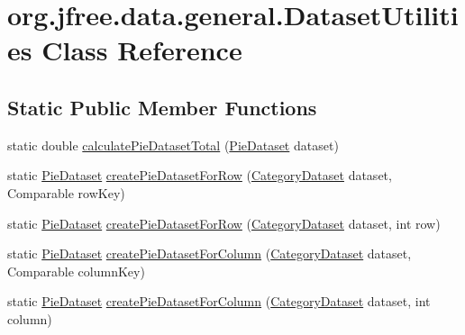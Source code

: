 \hypertarget{classorg_1_1jfree_1_1data_1_1general_1_1_dataset_utilities}{}\section{org.\+jfree.\+data.\+general.\+Dataset\+Utilities Class Reference}
\label{classorg_1_1jfree_1_1data_1_1general_1_1_dataset_utilities}
\subsection*{Static Public Member Functions}
\begin{DoxyCompactItemize}
\item 
static double \mbox{\hyperlink{classorg_1_1jfree_1_1data_1_1general_1_1_dataset_utilities_a576a9d596284f3e70b5db2d35bc0c935}{calculate\+Pie\+Dataset\+Total}} (\mbox{\hyperlink{interfaceorg_1_1jfree_1_1data_1_1general_1_1_pie_dataset}{Pie\+Dataset}} dataset)
\item 
static \mbox{\hyperlink{interfaceorg_1_1jfree_1_1data_1_1general_1_1_pie_dataset}{Pie\+Dataset}} \mbox{\hyperlink{classorg_1_1jfree_1_1data_1_1general_1_1_dataset_utilities_a13d630d93744c0af9a69fe7edafeb740}{create\+Pie\+Dataset\+For\+Row}} (\mbox{\hyperlink{interfaceorg_1_1jfree_1_1data_1_1category_1_1_category_dataset}{Category\+Dataset}} dataset, Comparable row\+Key)
\item 
static \mbox{\hyperlink{interfaceorg_1_1jfree_1_1data_1_1general_1_1_pie_dataset}{Pie\+Dataset}} \mbox{\hyperlink{classorg_1_1jfree_1_1data_1_1general_1_1_dataset_utilities_a87cf3dfa610dd380c0aad6e57db00fd5}{create\+Pie\+Dataset\+For\+Row}} (\mbox{\hyperlink{interfaceorg_1_1jfree_1_1data_1_1category_1_1_category_dataset}{Category\+Dataset}} dataset, int row)
\item 
static \mbox{\hyperlink{interfaceorg_1_1jfree_1_1data_1_1general_1_1_pie_dataset}{Pie\+Dataset}} \mbox{\hyperlink{classorg_1_1jfree_1_1data_1_1general_1_1_dataset_utilities_ae080298fa0ff744150fed9755bad6d2c}{create\+Pie\+Dataset\+For\+Column}} (\mbox{\hyperlink{interfaceorg_1_1jfree_1_1data_1_1category_1_1_category_dataset}{Category\+Dataset}} dataset, Comparable column\+Key)
\item 
static \mbox{\hyperlink{interfaceorg_1_1jfree_1_1data_1_1general_1_1_pie_dataset}{Pie\+Dataset}} \mbox{\hyperlink{classorg_1_1jfree_1_1data_1_1general_1_1_dataset_utilities_ab0f4908d86f2df20cb8d0ac047421dc7}{create\+Pie\+Dataset\+For\+Column}} (\mbox{\hyperlink{interfaceorg_1_1jfree_1_1data_1_1category_1_1_category_dataset}{Category\+Dataset}} dataset, int column)

\end{DoxyCompactItemize}

